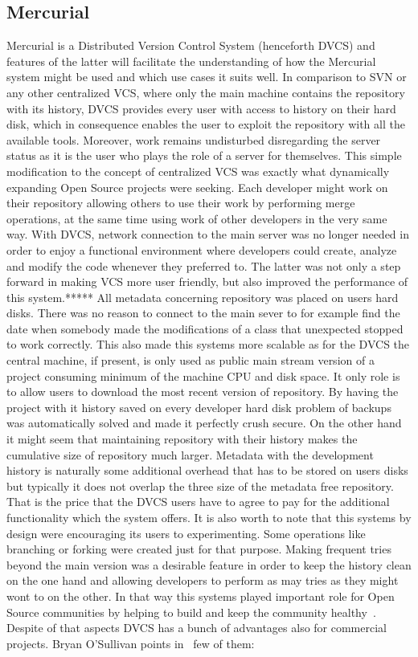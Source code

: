 \subsection{Mercurial}\label{subsec:hg}
Mercurial is a Distributed Version Control System (henceforth DVCS) and features of the latter will facilitate the understanding of how the Mercurial system might be used and which use cases it suits well. In comparison to SVN or any other centralized VCS, where only the main machine contains the repository with its history, DVCS provides every user with access to history on their hard disk, which in consequence enables the user to exploit the repository with all the available tools. Moreover, work remains undisturbed disregarding the server status as it is the user who plays the role of a server for themselves. This simple modification to the concept of centralized VCS was exactly what dynamically expanding Open Source projects were seeking. Each developer might work on their repository allowing others to use their work by performing merge operations, at the same time using work of other developers in the very same way. With DVCS, network connection to the main server was no longer needed in order to enjoy a functional environment where developers could create, analyze and modify the code whenever they preferred to. The latter was not only a step forward in making VCS more user friendly, but also improved the performance of this system.***** All metadata concerning repository was placed on users hard disks. There was no reason to connect to the main sever to for example find the date when somebody made the modifications of a class that unexpected stopped to work correctly. This also made this systems more scalable as for the DVCS the central machine, if present, is only used as public main stream version of a project consuming minimum of the machine CPU and disk space. It only role is to allow users to download the most recent version of repository. By having the project with it history saved on every developer hard disk problem of backups was automatically solved and made it perfectly crush secure. On the other hand it might seem that maintaining repository with their history makes the cumulative size of repository much larger. Metadata with the development history is naturally some additional overhead that has to be stored on users disks but typically it does not overlap the three size of the metadata free repository. That is the price that the DVCS users have to agree to pay for the additional functionality which the  system offers. It is also worth to note that this systems by design were encouraging its users to experimenting. Some operations like branching or forking were created just for that purpose. Making frequent tries beyond the main version was a desirable feature in order to keep the history clean on the one hand  and allowing developers to perform as may tries as they might wont to on the other. In that way this systems played important role for  Open Source communities by helping to build and keep the community healthy~\cite{git_talk,svn_talk}. Despite of that aspects DVCS has a bunch of advantages also for commercial projects. Bryan O'Sullivan points in~\cite[page 6]{hg_book} few of them: 
